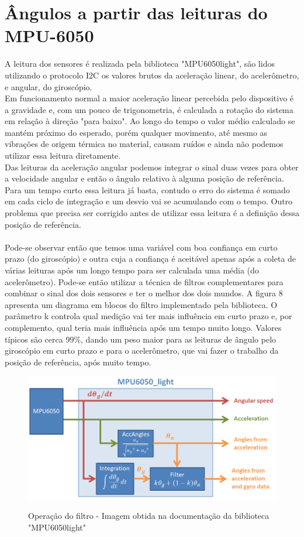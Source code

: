 \section{Ângulos a partir das leituras do MPU-6050}
A leitura dos sensores é realizada pela biblioteca "MPU6050\textunderscore light", são lidos utilizando o protocolo I2C os valores brutos da aceleração linear, do acelerômetro, e angular, do giroscópio.\\
\indent Em funcionamento normal a maior aceleração linear percebida pelo dispositivo é a gravidade e, com um pouco de trigonometria, é calculada a rotação do sistema em relação à direção "para baixo". Ao longo do tempo o valor médio calculado se mantém próximo do esperado, porém qualquer movimento, até mesmo as vibrações de origem térmica no material, causam ruídos e ainda não podemos utilizar essa leitura diretamente.\\
\indent Das leituras da aceleração angular podemos integrar o sinal duas vezes para obter a velocidade angular e então o ângulo relativo à alguma posição de referência. Para um tempo curto essa leitura já basta, contudo o erro do sistema é somado em cada ciclo de integração e um desvio vai se acumulando com o tempo. Outro problema que precisa ser corrigido antes de utilizar essa leitura é a definição dessa posição de referência.\\
\\
\indent Pode-se observar então que temos uma variável com boa confiança em curto prazo (do giroscópio) e outra cuja a confiança é aceitável apenas após a coleta de várias leituras após um longo tempo para ser calculada uma média (do acelerômetro). Pode-se então utilizar a técnica de filtros complementares para combinar o sinal dos dois sensores e ter o melhor dos dois mundos. A figura 8 apresenta um diagrama em blocos do filtro implementado pela biblioteca. O parâmetro k controla qual medição vai ter mais influência em curto prazo e, por complemento, qual teria mais influência após um tempo muito longo. Valores típicos são cerca 99\%, dando um peso maior para as leituras de ângulo pelo giroscópio em curto prazo e para o acelerômetro, que vai fazer o trabalho da posição de referência, após muito tempo.

\begin{figure}[H]
\centering
\includegraphics[width=1\textwidth]{Capitulo3 - Software/FiltroComplementar.png}\\
\caption{\label{fig:widgets}Operação do filtro - Imagem obtida na documentação da biblioteca "MPU6050\textunderscore light"}
\end{figure}


